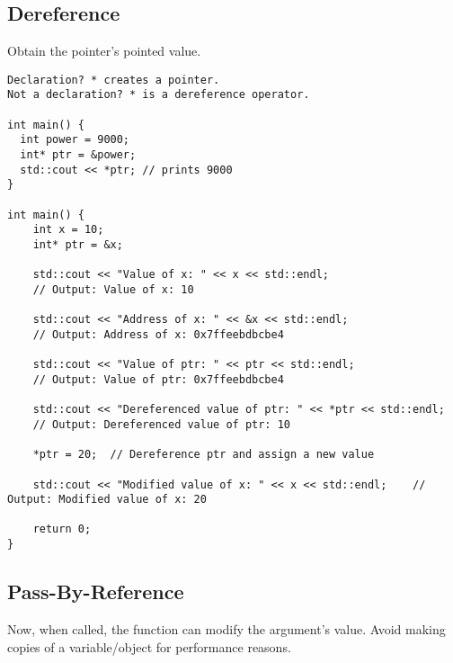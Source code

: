 \subsection{Dereference}

Obtain the pointer's pointed value. 

\begin{verbatim}
Declaration? * creates a pointer.
Not a declaration? * is a dereference operator.

int main() {
  int power = 9000;
  int* ptr = &power;
  std::cout << *ptr; // prints 9000
}

int main() {
    int x = 10;
    int* ptr = &x;

    std::cout << "Value of x: " << x << std::endl;            
    // Output: Value of x: 10

    std::cout << "Address of x: " << &x << std::endl;         
    // Output: Address of x: 0x7ffeebdbcbe4

    std::cout << "Value of ptr: " << ptr << std::endl;        
    // Output: Value of ptr: 0x7ffeebdbcbe4

    std::cout << "Dereferenced value of ptr: " << *ptr << std::endl;  
    // Output: Dereferenced value of ptr: 10

    *ptr = 20;  // Dereference ptr and assign a new value

    std::cout << "Modified value of x: " << x << std::endl;    // Output: Modified value of x: 20

    return 0;
}
\end{verbatim}

\subsection{Pass-By-Reference}

Now, when called, the function can modify the argument's value.
Avoid making copies of a variable/object for performance reasons.

